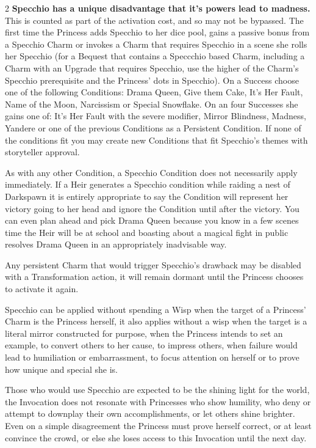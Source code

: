 \begin{multicols}{2}
\textbf{Specchio has a unique disadvantage that it's powers lead to madness.} This is counted as part of the activation cost, and so may not be bypassed. The first time the Princess adds Specchio to her dice pool, gains a passive bonus from a Specchio Charm or invokes a Charm that requires Specchio in a scene she rolls her Specchio (for a Bequest that contains a Speccchio based Charm, including a Charm with an Upgrade that requires Specchio, use the higher of the Charm's Specchio prerequisite and the Princess' dots in Specchio). On a Success choose one of the following Conditions: Drama Queen, Give them Cake, It's Her Fault, Name of the Moon, Narcissism or Special Snowflake. On an four Successes she gains one of: It's Her Fault with the severe modifier, Mirror Blindness, Madness, Yandere or one of the previous Conditions as a Persistent Condition. If none of the conditions fit you may create new Conditions that fit Specchio's themes with storyteller approval. 

As with any other Condition, a Specchio Condition does not necessarily apply immediately. If a Heir generates a Specchio condition while raiding a nest of Darkspawn it is entirely appropriate to say the Condition will represent her victory going to her head and ignore the Condition until after the victory. You can even plan ahead and pick Drama Queen because you know in a few scenes time the Heir will be at school and boasting about a magical fight in public resolves Drama Queen in an appropriately inadvisable way.  

Any persistent Charm that would trigger Specchio's drawback may be disabled with a Transformation action, it will remain dormant until the Princess chooses to activate it again. 

Specchio can be applied without spending a Wisp when the target of a Princess' Charm is the Princess herself, it also applies without a wisp when the target is a literal mirror constructed for purpose, when the Princess intends to set an example, to convert others to her cause, to impress others, when failure would lead to humiliation or embarrassment, to focus attention on herself or to prove how unique and special she is.

Those who would use Specchio are expected to be the shining light for the world, the Invocation does not resonate with Princesses who show humility, who deny or attempt to downplay their own accomplishments, or let others shine brighter. Even on a simple disagreement the Princess must prove herself correct, or at least convince the crowd, or else she loses access to this Invocation until the next day. 



\end{multicols}
